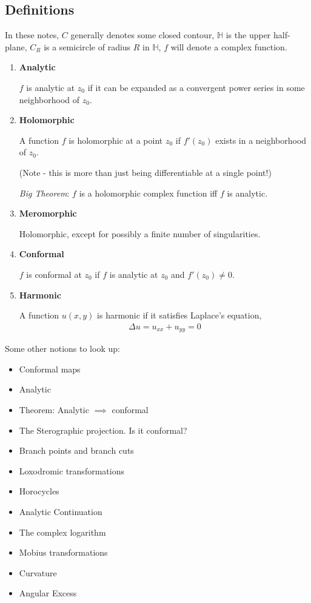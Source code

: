 \hypertarget{definitions-3}{%
\subsection{Definitions}\label{definitions-3}}

In these notes, \(C\) generally denotes some closed contour,
\(\mathbb{H}\) is the upper half-plane, \(C_R\) is a semicircle of
radius \(R\) in \(\mathbb{H}\), \(f\) will denote a complex function.

\begin{enumerate}
\def\labelenumi{\arabic{enumi}.}
\item
  \textbf{Analytic}

  \(f\) is analytic at \(z_0\) if it can be expanded as a convergent
  power series in some neighborhood of \(z_0\).
\item
  \textbf{Holomorphic}

  A function \(f\) is holomorphic at a point \(z_0\) if \(f'(z_0)\)
  exists in a neighborhood of \(z_0\).

  (Note - this is more than just being differentiable at a single
  point!)

  \emph{Big Theorem}: \(f\) is a holomorphic complex function iff \(f\)
  is analytic.
\item
  \textbf{Meromorphic}

  Holomorphic, except for possibly a finite number of singularities.
\item
  \textbf{Conformal}

  \(f\) is conformal at \(z_0\) if \(f\) is analytic at \(z_0\) and
  \(f'(z_0) \neq 0\).
\item
  \textbf{Harmonic}

  A function \(u(x,y)\) is harmonic if it satisfies Laplace's equation,
  \begin{align*}\Delta u = u_{xx} + u_{yy} = 0\end{align*}
\end{enumerate}

Some other notions to look up:

\begin{itemize}
\tightlist
\item
  Conformal maps
\item
  Analytic
\item
  Theorem: Analytic \(\implies\) conformal
\item
  The Sterographic projection. Is it conformal?
\item
  Branch points and branch cuts
\item
  Loxodromic transformations
\item
  Horocycles
\item
  Analytic Continuation
\item
  The complex logarithm
\item
  Mobius transformations
\item
  Curvature
\item
  Angular Excess
\end{itemize}

